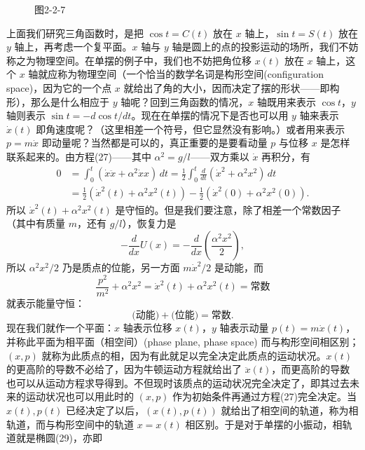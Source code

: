 \begin{figure}[htbp]
\centering
{}
\caption*{图2-2-7}
\end{figure}

上面我们研究三角函数时，是把 $\cos t=C(t)$ 放在 $x$ 轴上，$\sin t=S(t)$ 放在 $y$ 轴上，再考虑一个复平面。$x$ 轴与 $y$ 轴是圆上的点的投影运动的场所，我们不妨称之为物理空间。在单摆的例子中，我们也不妨把角位移 $x(t)$ 放在 $x$ 轴上，这个 $x$ 轴就应称为物理空间（一个恰当的数学名词是构形空间(configuration space)，因为它的一个点 $x$ 就给出了角的大小，因而决定了摆的形状——即构形），那么是什么相应于 $y$ 轴呢？回到三角函数的情况，$x$ 轴既用来表示 $\cos t$，$y$ 轴则表示 $\sin t=-d\cos t/dt$。现在在单摆的情况下是否也可以用 $y$ 轴来表示 $\dot x(t)$ 即角速度呢？（这里相差一个符号，但它显然没有影响。）或者用来表示 $p=m\dot x$ 即动量呢？当然都是可以的，真正重要的是要看动量 $p$ 与位移 $x$ 是怎样联系起来的。由方程(27)——其中 $\alpha^2=g/l$——双方乘以 $\dot x$ 再积分，有
\[
\begin{aligned}
0&=\int_0^t(\dot x\ddot x+\alpha^2\dot x x)\,dt
=\frac12\int_0^t\frac d{dt}(\dot x^2+\alpha^2x^2)\,dt\\
&=\frac12(\dot x^2(t)+\alpha^2x^2(t))-\frac12(\dot x^2(0)+\alpha^2x^2(0)).
\end{aligned}
\]
所以 $\dot x^2(t)+\alpha^2x^2(t)$ 是守恒的。但是我们要注意，除了相差一个常数因子（其中有质量 $m$，还有 $g/l$），恢复力是
\[
-\frac d{dx}U(x)=-\frac d{dx}\left(\frac{\alpha^2x^2}{2}\right),
\]
所以 $\alpha^2x^2/2$ 乃是质点的位能，另一方面 $m\dot x^2/2$ 是动能，而
\[
\frac{p^2}{m^2}+\alpha^2x^2=\dot x^2(t)+\alpha^2x^2(t)=\text{常数} \tag{29}
\]
就表示能量守恒：
\[
\text{(动能)}+\text{(位能)}=\text{常数}.
\]
现在我们就作一个平面：$x$ 轴表示位移 $x(t)$，$y$ 轴表示动量 $p(t)=m\dot x(t)$，并称此平面为相平面（相空间）(phase plane, phase space) 而与构形空间相区别；$(x,p)$ 就称为此质点的相，因为有此就足以完全决定此质点的运动状况。$x(t)$ 的更高阶的导数不必给了，因为牛顿运动方程就给出了 $\ddot x(t)$，而更高阶的导数也可以从运动方程求导得到。不但现时该质点的运动状况完全决定了，即其过去未来的运动状况也可以用此时的 $(x,p)$ 作为初始条件再通过方程(27)完全决定。当 $x(t),p(t)$ 已经决定了以后，$(x(t),p(t))$ 就给出了相空间的轨道，称为相轨道，而与构形空间中的轨道 $x=x(t)$ 相区别。于是对于单摆的小振动，相轨道就是椭圆(29)，亦即
